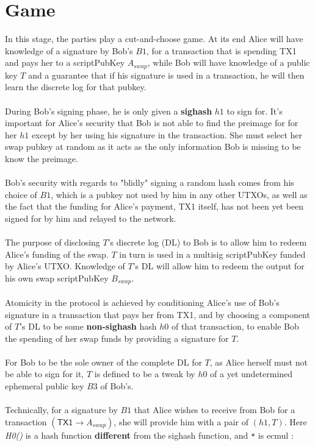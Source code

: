 \documentclass[12pt,a4paper]{article}
\begin{document}
\section{Game}
In this stage, the parties play a cut-and-choose game.  At its end Alice will have knowledge of a signature by Bob's $B1$, for a transaction that is spending \textsf{TX1} and pays her to a scriptPubKey $A_{swap}$, while Bob will have knowledge of a public key $T$ and a guarantee that if his signature is used in a transaction, he will then learn the discrete log for that pubkey. \\ \\
During Bob's signing phase, he is only given a \textbf{sighash} $h1$ to sign for.  It's important for Alice's security that Bob is not able to find the preimage for for her $h1$ except by her using his signature in the transaction.  She must select her swap pubkey at random as it acts as the only information Bob is missing to be know the preimage. \\ \\
Bob's security with regards to "blidly" signing a random hash comes from his choice of $B1$, which is a pubkey not used by him in any other UTXOs, as well as the fact that the funding for Alice's payment, \textsf{TX1} itself, has not been yet been signed for by him and relayed to the network.
\\ \\
The purpose of disclosing $T$'s discrete log (DL) to Bob is to allow him to redeem Alice's funding of the swap.  $T$ in turn is used in a multisig scriptPubKey funded by Alice's UTXO.  Knowledge of $T$'s DL will allow him to redeem the output for his own swap scriptPubKey $B_{swap}$. \\ \\
Atomicity in the protocol is achieved by conditioning Alice's use of Bob's signature in a transaction that pays her from \textsf{TX1}, and by choosing a component of $T$'s DL to be some \textbf{non-sighash} hash $h0$ of that transaction, to enable Bob the spending of her swap funds by providing a signature for $T$. \\ \\
For Bob to be the sole owner of the complete DL for $T$, as Alice herself must not be able to sign for it, $T$ is defined to be a tweak by $h0$ of a yet undetermined ephemeral public key $B3$ of Bob's. \\  \\
Technically, for a signature by $B1$ that Alice wishes to receive from Bob for a transaction $(\textsf{TX1} \rightarrow A_{swap})$, she will provide him with a pair of $(h1, T)$.  Here \emph{H0()} is a hash function \textbf{different} from the sighash function, and \texttt{*} is ecmul :
\end{document}
